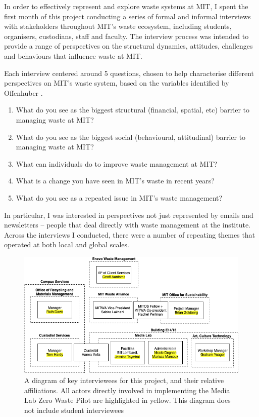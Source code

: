 \documentclass[nofonts,nols,justified,nobib]{tufte-book}
\begin{document}
In order to effectively represent and explore waste systems at MIT, I spent the first month of this project conducting a series of formal and informal interviews with stakeholders throughout MIT's waste ecosystem, including students, organisers, custodians, staff and faculty. The interview process was intended to provide a range of perspectives on the structural dynamics, attitudes, challenges and behaviours that influence waste at MIT.

Each interview centered around 5 questions, chosen to help characterise different perspectives on MIT's waste system, based on the variables identified by Offenhuber \cite{offenhuber_waste_2017}.

\begin{enumerate}
\item What do you see as the biggest structural (financial, spatial, etc) barrier to managing waste at MIT?
\item What do you see as the biggest social (behavioural, attitudinal) barrier to managing waste at MIT?
\item What can individuals do to improve waste management at MIT?
\item What is a change you have seen in MIT's waste in recent years?
\item What do you see as a repeated issue in MIT's waste management?
\end{enumerate}

In particular, I was interested in perspectives not just represented by emails and newsletters -- people that deal directly with waste management at the institute. Across the interviews I conducted, there were a number of repeating themes that operated at both local and global scales.

\begin{figure}
  \caption{A diagram of key interviewees for this project, and their relative affiliations. All actors directly involved in implementing the Media Lab Zero Waste Pilot are highlighted in yellow. This diagram does not include student interviewees}
  \includegraphics[width=1\linewidth]{img/2/interviewees.png}
\end{figure}
\end{document}
